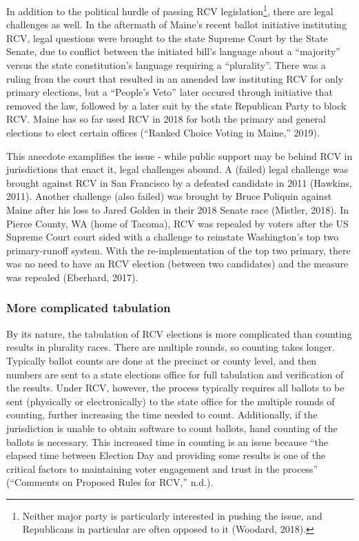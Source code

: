 \documentclass[12pt,twoside]{reedthesis}
\begin{document}
In addition to the political hurdle of passing RCV legislation\footnote{Neither major party is particularly interested in pushing the issue, and Republicans in particular are often opposed to it (Woodard, 2018).}, there are legal challenges as well. In the aftermath of Maine's recent ballot initiative instituting RCV, legal questions were brought to the state Supreme Court by the State Senate, due to conflict between the initiated bill's language about a ``majority'' versus the state constitution's language requiring a ``plurality''. There was a ruling from the court that resulted in an amended law instituting RCV for only primary elections, but a ``People's Veto'' later occured through initiative that removed the law, followed by a later suit by the state Republican Party to block RCV. Maine has so far used RCV in 2018 for both the primary and general elections to elect certain offices (``Ranked Choice Voting in Maine,'' 2019).

This anecdote examplifies the issue - while public support may be behind RCV in jurisdictions that enact it, legal challenges abound. A (failed) legal challenge was brought against RCV in San Francisco by a defeated candidate in 2011 (Hawkins, 2011). Another challenge (also failed) was brought by Bruce Poliquin against Maine after his loss to Jared Golden in their 2018 Senate race (Mistler, 2018). In Pierce County, WA (home of Tacoma), RCV was repealed by voters after the US Supreme Court court sided with a challenge to reinstate Washington's top two primary-runoff system. With the re-implementation of the top two primary, there was no need to have an RCV election (between two candidates) and the measure was repealed (Eberhard, 2017).

\hypertarget{more-complicated-tabulation}{%
\subsubsection{More complicated tabulation}\label{more-complicated-tabulation}}

By its nature, the tabulation of RCV elections is more complicated than counting results in plurality races. There are multiple rounds, so counting takes longer. Typically ballot counts are done at the precinct or county level, and then numbers are sent to a state elections office for full tabulation and verification of the results. Under RCV, however, the process typically requires all ballots to be sent (physically or electronically) to the state office for the multiple rounds of counting, further increasing the time needed to count. Additionally, if the jurisdiction is unable to obtain software to count ballots, hand counting of the ballots is necessary. This increased time in counting is an issue because ``the elapsed time between Election Day and providing some results is one of the critical factors to maintaining voter engagement and trust in the process'' (``Comments on Proposed Rules for RCV,'' n.d.).
\end{document}
